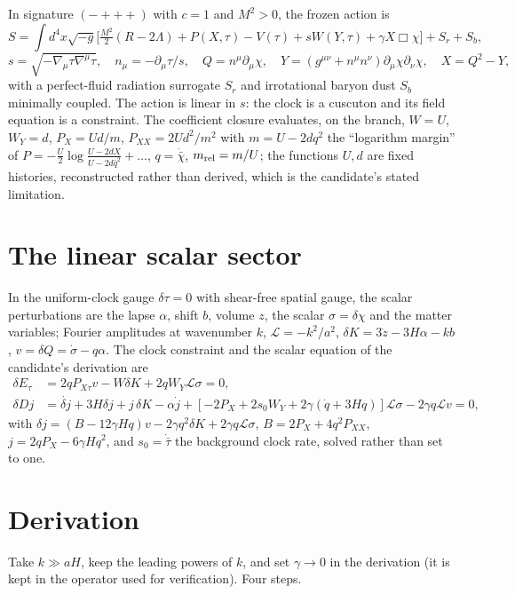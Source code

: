 \documentclass[11pt,letterpaper]{article}
\begin{document}
In signature $(-{+}{+}{+})$ with $c=1$ and $M^2>0$, the frozen action is
\begin{equation}
S=\int d^4x\sqrt{-g}\Big[\tfrac{M^2}{2}(R-2\Lambda)+P(X,\tau)-V(\tau)+sW(Y,\tau)+\gamma X\Box\chi\Big]+S_r+S_b,
\end{equation}
\begin{equation}
s=\sqrt{-\nabla_\mu\tau\nabla^\mu\tau},\quad n_\mu=-\partial_\mu\tau/s,\quad Q=n^\mu\partial_\mu\chi,\quad Y=(g^{\mu\nu}+n^\mu n^\nu)\partial_\mu\chi\partial_\nu\chi,\quad X=Q^2-Y,
\end{equation}
with a perfect-fluid radiation surrogate $S_r$ and irrotational baryon dust $S_b$ minimally coupled. The action is linear in $s$: the clock is a cuscuton \cite{cuscuton} and its field equation is a constraint. The coefficient closure evaluates, on the branch, $W=U$, $W_Y=d$, $P_X=Ud/m$, $P_{XX}=2Ud^2/m^2$ with $m=U-2dq^2$ the ``logarithm margin'' of $P=-\tfrac{U}{2}\log\frac{U-2dX}{U-2d\bar q^2}+\dots$, $q=\dot{\bar\chi}$, $m_{\rm rel}=m/U$; the functions $U,d$ are fixed histories, reconstructed rather than derived, which is the candidate's stated limitation.

\section{The linear scalar sector}
In the uniform-clock gauge $\delta\tau=0$ with shear-free spatial gauge, the scalar perturbations are the lapse $\alpha$, shift $b$, volume $z$, the scalar $\sigma=\delta\chi$ and the matter variables; Fourier amplitudes at wavenumber $k$, $\mathcal L=-k^2/a^2$, $\delta K=3\dot z-3H\alpha-kb$, $v=\delta Q=\dot\sigma-q\alpha$. The clock constraint and the scalar equation of the candidate's derivation are
\begin{align}
\delta E_\tau&=2qP_{X\tau}v-W\delta K+2qW_Y\mathcal L\sigma=0,\label{clock}\\
\delta Dj&=\dot{\delta j}+3H\delta j+j\,\delta K-\alpha\dot j+[-2P_X+2s_0W_Y+2\gamma(\dot q+3Hq)]\mathcal L\sigma-2\gamma q\mathcal Lv=0,\label{chi}
\end{align}
with $\delta j=(B-12\gamma Hq)v-2\gamma q^2\delta K+2\gamma q\mathcal L\sigma$, $B=2P_X+4q^2P_{XX}$, $j=2qP_X-6\gamma Hq^2$, and $s_0=\dot{\bar\tau}$ the background clock rate, solved rather than set to one.

\section{Derivation}
Take $k\gg aH$, keep the leading powers of $k$, and set $\gamma\to0$ in the derivation (it is kept in the operator used for verification). Four steps.
\end{document}
